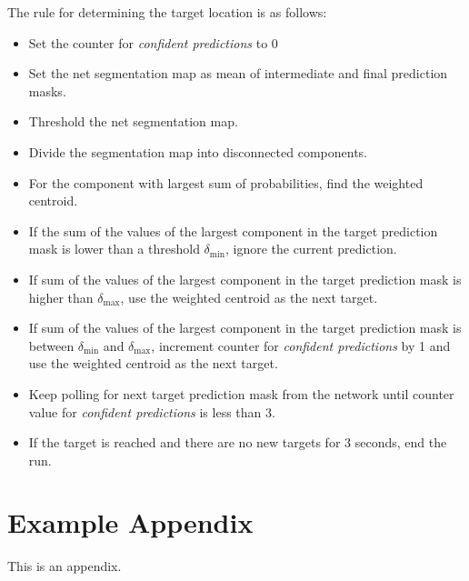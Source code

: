 \documentclass[11pt]{article}
\begin{document}
The rule for determining the target location is as follows:
\begin{itemize}
    \item Set the counter for \textit{confident predictions} to 0
    \item Set the net segmentation map as mean of intermediate and final prediction masks.
    \item Threshold the net segmentation map.
    \item Divide the segmentation map into disconnected components.
    \item For the component with largest sum of probabilities, find the weighted centroid.
    \item If the sum of the values of the largest component in the target prediction mask is lower than a threshold $\delta_{\min}$, ignore the current prediction.
    \item If sum of the values of the largest component in the target prediction mask is higher than $\delta_{\max}$, use the weighted centroid as the next target.
    \item If sum of the values of the largest component in the target prediction mask is between $\delta_{\min}$ and $\delta_{\max}$, increment counter for \textit{confident predictions} by 1 and use the weighted centroid as the next target.
    
    \item Keep polling for next target prediction mask from the network until counter value for \textit{confident predictions} is less than 3.
    \item If the target is reached and there are no new targets for 3 seconds, end the run.

\end{itemize}




\appendix

\section{Example Appendix}
\label{sec:appendix}

This is an appendix.
\end{document}

